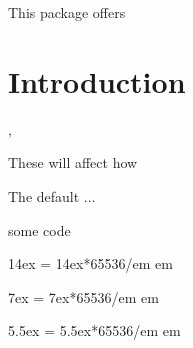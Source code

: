 \documentclass[10pt]{article}
\begin{document}
  

\begin{typesetabstract}
 
This package offers 
\end{typesetabstract}


\section{Introduction}

\begin{codedescribe}{\somecmd ,\somecmd}
\begin{codesyntax}%
\tsmacro{\somecmd}{}
\tsmacro{\somecmd}{}
\end{codesyntax}
These will affect how
\end{codedescribe}
\begin{tsremark}
  The default ...
\end{tsremark}


\begin{codestore}[demoA]
some code
\end{codestore}


\makeatletter
\def\convertto#1#2{#1 = \strip@pt\dimexpr #1*65536/\number{}#2 #2\par}
\makeatother
\convertto{14ex}{em}
\convertto{7ex}{em}
\convertto{5.5ex}{em}
\end{document}
